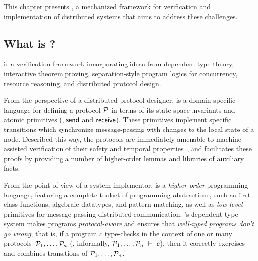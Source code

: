 



\noindent
%
This chapter presents \disel, a mechanized framework for
verification and implementation of distributed systems that aims to
address these challenges.

\subsection{What is \disel?}
\label{sec:wtf-disel}

\disel is a verification framework incorporating ideas from dependent
type theory, interactive theorem proving, separation-style program
logics for concurrency, resource reasoning, and distributed protocol
design.

From the perspective of a distributed protocol designer, \disel is a
domain-specific language for defining a protocol $\mathcal{P}$ in terms of
its state-space invariants and atomic primitives (\eg, $\mathsf{send}$ and
$\mathsf{receive}$). These primitives implement specific transitions which
synchronize message-passing with changes to the local state of a
node. Described this way, the protocols are immediately amenable to
machine-assisted verification of their safety and temporal
properties~\cite{Wilcox-al:PLDI15,rahli:eventml-avocs}, and \disel
facilitates these proofs by providing a number of higher-order lemmas
and libraries of auxiliary facts.

From the point of view of a system implementor, \disel is a
\emph{higher-order} programming language, featuring a complete toolset
of programming abstractions, such as first-class functions, algebraic
datatypes, and pattern matching, as well as \emph{low-level}
primitives for message-passing distributed communication. \disel's
dependent type system makes programs \emph{protocol-aware} and ensures
that \emph{well-typed programs don't go wrong}; that is, if a program
$c$ type-checks in the context of one or many
protocols~$\mathcal{P}_1, \ldots, \mathcal{P}_n$ (\ie, informally,
$\mathcal{P}_1, \ldots, \mathcal{P}_n~\vdash~c$), then it correctly exercises and
combines transitions of $\mathcal{P}_1, \ldots, \mathcal{P}_n$.

